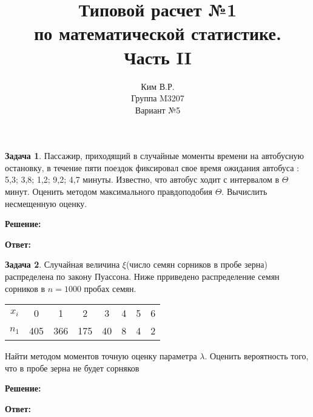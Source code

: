 \documentclass[a4paper,12pt]{article}
\title{Типовой расчет №1 \\ по математической статистике. \\ Часть II}
\author{Ким В.Р. \\ Группа M3207 \\ Вариант №5}
\date{}
\theoremstyle{definition}
\newtheorem{problem}{Задача}\setlength{\parindent}{0pt}
\newenvironment{solution}
{\begin{shaded}\textbf{Решение:}\par\setlength{\parindent}{0pt}}
{\end{shaded}}
\newenvironment{answer}
{\par\noindent\textbf{Ответ:} \color{blue}}
{\par}
\begin{document}
\maketitle

\begin{problem}
    Пассажир, приходящий в случайные моменты времени на автобусную остановку, в течение
    пяти поездок фиксировал свое время ожидания автобуса : 5,3; 3,8; 1,2; 9,2; 4,7 минуты.
    Известно, что автобус ходит с интервалом в \( \Theta \) минут. Оценить методом максимального
    правдоподобия \( \Theta \). Вычислить несмещенную оценку.

    \begin{solution}
    \end{solution}

    \begin{answer}
    \end{answer}

\end{problem}



\begin{problem}
    Случайная величина \( \xi \)(число семян сорников в пробе зерна) распределена по закону Пуассона.
    Ниже прриведено распределение семян сорников в \( n = 1000 \) пробах семян. 

    \begin{table}[H]
        \centering
        \begin{adjustbox}{max width=\textwidth}
            \begin{tabular}{c c c c c c c c}
                \toprule
                \midrule
                    \(x_i\) & 0   & 1   & 2   & 3  & 4 & 5 & 6 \\
                    \(n_1\) & 405 & 366 & 175 & 40 & 8 & 4 & 2 \\
            \bottomrule
            \end{tabular}
        \end{adjustbox}
    \end{table}  

    Найти методом моментов точную оценку параметра \( \lambda \). 
    Оценить вероятность того, что в пробе зерна не будет сорняков 

    \begin{solution}
    \end{solution}

    \begin{answer}
    \end{answer}

\end{problem}
\end{document}
